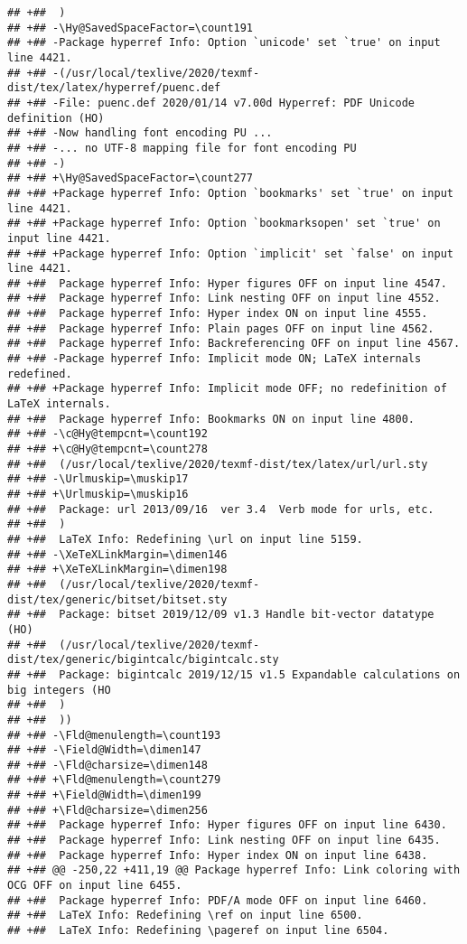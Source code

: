 \documentclass[ignorenonframetext,]{beamer}
\begin{document}
\begin{verbatim}
## +##  )
## +## -\Hy@SavedSpaceFactor=\count191
## +## -Package hyperref Info: Option `unicode' set `true' on input line 4421.
## +## -(/usr/local/texlive/2020/texmf-dist/tex/latex/hyperref/puenc.def
## +## -File: puenc.def 2020/01/14 v7.00d Hyperref: PDF Unicode definition (HO)
## +## -Now handling font encoding PU ...
## +## -... no UTF-8 mapping file for font encoding PU
## +## -)
## +## +\Hy@SavedSpaceFactor=\count277
## +## +Package hyperref Info: Option `bookmarks' set `true' on input line 4421.
## +## +Package hyperref Info: Option `bookmarksopen' set `true' on input line 4421.
## +## +Package hyperref Info: Option `implicit' set `false' on input line 4421.
## +##  Package hyperref Info: Hyper figures OFF on input line 4547.
## +##  Package hyperref Info: Link nesting OFF on input line 4552.
## +##  Package hyperref Info: Hyper index ON on input line 4555.
## +##  Package hyperref Info: Plain pages OFF on input line 4562.
## +##  Package hyperref Info: Backreferencing OFF on input line 4567.
## +## -Package hyperref Info: Implicit mode ON; LaTeX internals redefined.
## +## +Package hyperref Info: Implicit mode OFF; no redefinition of LaTeX internals.
## +##  Package hyperref Info: Bookmarks ON on input line 4800.
## +## -\c@Hy@tempcnt=\count192
## +## +\c@Hy@tempcnt=\count278
## +##  (/usr/local/texlive/2020/texmf-dist/tex/latex/url/url.sty
## +## -\Urlmuskip=\muskip17
## +## +\Urlmuskip=\muskip16
## +##  Package: url 2013/09/16  ver 3.4  Verb mode for urls, etc.
## +##  )
## +##  LaTeX Info: Redefining \url on input line 5159.
## +## -\XeTeXLinkMargin=\dimen146
## +## +\XeTeXLinkMargin=\dimen198
## +##  (/usr/local/texlive/2020/texmf-dist/tex/generic/bitset/bitset.sty
## +##  Package: bitset 2019/12/09 v1.3 Handle bit-vector datatype (HO)
## +##  (/usr/local/texlive/2020/texmf-dist/tex/generic/bigintcalc/bigintcalc.sty
## +##  Package: bigintcalc 2019/12/15 v1.5 Expandable calculations on big integers (HO
## +##  )
## +##  ))
## +## -\Fld@menulength=\count193
## +## -\Field@Width=\dimen147
## +## -\Fld@charsize=\dimen148
## +## +\Fld@menulength=\count279
## +## +\Field@Width=\dimen199
## +## +\Fld@charsize=\dimen256
## +##  Package hyperref Info: Hyper figures OFF on input line 6430.
## +##  Package hyperref Info: Link nesting OFF on input line 6435.
## +##  Package hyperref Info: Hyper index ON on input line 6438.
## +## @@ -250,22 +411,19 @@ Package hyperref Info: Link coloring with OCG OFF on input line 6455.
## +##  Package hyperref Info: PDF/A mode OFF on input line 6460.
## +##  LaTeX Info: Redefining \ref on input line 6500.
## +##  LaTeX Info: Redefining \pageref on input line 6504.

\end{verbatim}
\end{document}
